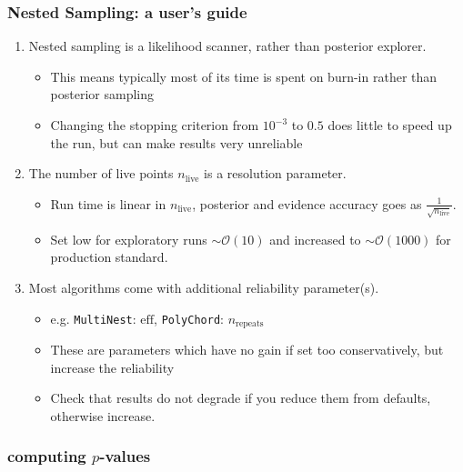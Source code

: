 \documentclass[aspectratio=169,handout]{beamer}
\begin{document}
\begin{frame}
    \frametitle{Nested Sampling: a user's guide}
    \begin{enumerate}
        \item Nested sampling is a likelihood scanner, rather than posterior explorer.
            \begin{itemize}
                \item This means typically most of its time is spent on burn-in rather than posterior sampling
                \item Changing the stopping criterion from $10^{-3}$ to $0.5$ does little to speed up the run, but can make results very unreliable
            \end{itemize}
        \item The number of live points $n_\mathrm{live}$ is a resolution parameter.
            \begin{itemize}
                \item Run time is linear in $n_\mathrm{live}$, posterior and evidence accuracy goes as $\frac{1}{\sqrt{n_\mathrm{live}}}$.
                \item Set low for exploratory runs $\sim\mathcal{O}(10)$ and increased to $\sim\mathcal{O}(1000)$ for production standard.
            \end{itemize}
        \item Most algorithms come with additional reliability parameter(s).
            \begin{itemize}
                \item e.g. \texttt{MultiNest}: $\text{eff}$, \texttt{PolyChord}: $n_\mathrm{repeats}$
                \item These are parameters which have no gain if set too conservatively, but increase the reliability
                \item Check that results do not degrade if you reduce them from defaults, otherwise increase.
            \end{itemize}
    \end{enumerate}
\end{frame}


\begin{frame}
    \frametitle{computing $p$-values}
\end{frame}
\end{document}
